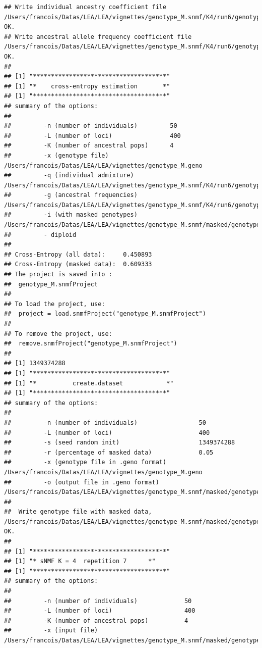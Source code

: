 \documentclass[12pt,a4paper,oneside]{article}\usepackage[]{graphicx}\usepackage[]{color}
\makeatletter
\newenvironment{kframe}{%
 \def\at@end@of@kframe{}%
 \ifinner\ifhmode%
  \def\at@end@of@kframe{\end{minipage}}%
  \begin{minipage}{\columnwidth}%
 \fi\fi%
 \def\FrameCommand##1{\hskip\@totalleftmargin \hskip-\fboxsep
 \colorbox{shadecolor}{##1}\hskip-\fboxsep
     \hskip-\linewidth \hskip-\@totalleftmargin \hskip\columnwidth}%
 \MakeFramed {\advance\hsize-\width
   \@totalleftmargin\z@ \linewidth\hsize
   \@setminipage}}%
 {\par\unskip\endMakeFramed%
 \at@end@of@kframe}
\newenvironment{knitrout}{}{} %
\makeatother
\begin{document}
\begin{knitrout}
\begin{kframe}
\begin{verbatim}
## Write individual ancestry coefficient file /Users/francois/Datas/LEA/LEA/vignettes/genotype_M.snmf/K4/run6/genotype_M_r6.4.Q:		OK.
## Write ancestral allele frequency coefficient file /Users/francois/Datas/LEA/LEA/vignettes/genotype_M.snmf/K4/run6/genotype_M_r6.4.G:	OK.
## 
## [1] "*************************************"
## [1] "*    cross-entropy estimation       *"
## [1] "*************************************"
## summary of the options:
## 
##         -n (number of individuals)         50
##         -L (number of loci)                400
##         -K (number of ancestral pops)      4
##         -x (genotype file)                 /Users/francois/Datas/LEA/LEA/vignettes/genotype_M.geno
##         -q (individual admixture)          /Users/francois/Datas/LEA/LEA/vignettes/genotype_M.snmf/K4/run6/genotype_M_r6.4.Q
##         -g (ancestral frequencies)         /Users/francois/Datas/LEA/LEA/vignettes/genotype_M.snmf/K4/run6/genotype_M_r6.4.G
##         -i (with masked genotypes)         /Users/francois/Datas/LEA/LEA/vignettes/genotype_M.snmf/masked/genotype_M_I.geno
##         - diploid
## 
## Cross-Entropy (all data):	 0.450893
## Cross-Entropy (masked data):	 0.609333
## The project is saved into :
##  genotype_M.snmfProject 
## 
## To load the project, use:
##  project = load.snmfProject("genotype_M.snmfProject")
## 
## To remove the project, use:
##  remove.snmfProject("genotype_M.snmfProject")
## 
## [1] 1349374288
## [1] "*************************************"
## [1] "*          create.dataset            *"
## [1] "*************************************"
## summary of the options:
## 
##         -n (number of individuals)                 50
##         -L (number of loci)                        400
##         -s (seed random init)                      1349374288
##         -r (percentage of masked data)             0.05
##         -x (genotype file in .geno format)         /Users/francois/Datas/LEA/LEA/vignettes/genotype_M.geno
##         -o (output file in .geno format)           /Users/francois/Datas/LEA/LEA/vignettes/genotype_M.snmf/masked/genotype_M_I.geno
## 
##  Write genotype file with masked data, /Users/francois/Datas/LEA/LEA/vignettes/genotype_M.snmf/masked/genotype_M_I.geno:		OK.
## 
## [1] "*************************************"
## [1] "* sNMF K = 4  repetition 7      *"
## [1] "*************************************"
## summary of the options:
## 
##         -n (number of individuals)             50
##         -L (number of loci)                    400
##         -K (number of ancestral pops)          4
##         -x (input file)                        /Users/francois/Datas/LEA/LEA/vignettes/genotype_M.snmf/masked/genotype_M_I.geno

\end{verbatim}
\end{kframe}
\end{knitrout}
\end{document}
